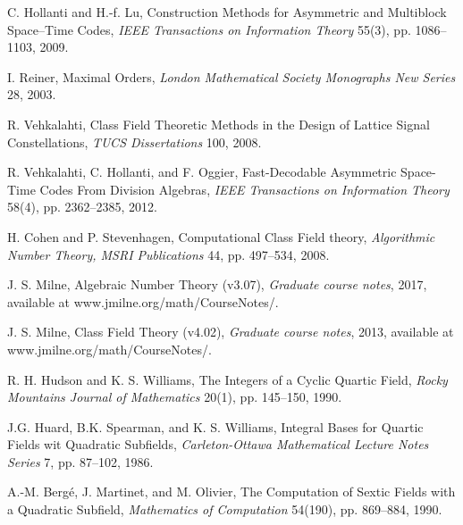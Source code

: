 \documentclass[smallextended]{svjour3}
\begin{document}
\begin{thebibliography}{99}
C. Hollanti and H.-f. Lu,
Construction Methods for Asymmetric and Multiblock Space--Time Codes,
\textit{IEEE Transactions on Information Theory} 55(3), pp. 1086--1103, 2009.

I. Reiner,
Maximal Orders, 
\textit{London Mathematical Society Monographs New Series} 28, 2003.

R. Vehkalahti, 
Class Field Theoretic Methods in the Design of Lattice Signal Constellations, 
\textit{TUCS Dissertations} 100, 2008.
 
R. Vehkalahti, C. Hollanti, and F. Oggier, 
Fast-Decodable Asymmetric Space-Time Codes From Division Algebras, 
\emph{IEEE Transactions on Information Theory} 58(4), pp. 2362--2385, 2012.
 
 
H. Cohen and P. Stevenhagen, 
Computational Class Field theory, 
\textit{Algorithmic Number Theory, MSRI Publications} 44, pp. 497--534, 2008.

J. S. Milne,
Algebraic Number Theory (v3.07), 
\textit{Graduate course notes}, 2017, available at www.jmilne.org/math/CourseNotes/.

J. S. Milne, 
Class Field Theory (v4.02), 
\textit{Graduate course notes}, 2013, available at www.jmilne.org/math/CourseNotes/.

R. H. Hudson and K. S. Williams, 
The Integers of a Cyclic Quartic Field, 
\textit{Rocky Mountains Journal of Mathematics} 20(1), pp. 145--150, 1990.
  
J.G. Huard, B.K. Spearman, and K. S. Williams, 
Integral Bases for Quartic Fields wit Quadratic Subfields, 
\textit{Carleton-Ottawa Mathematical Lecture Notes Series} 7, pp. 87--102, 1986.

A.-M. Berg\'e, J. Martinet, and M. Olivier, 
The Computation of Sextic Fields with a Quadratic Subfield,
\textit{Mathematics of Computation} 54(190), pp. 869--884, 1990.





  

\end{thebibliography}
\end{document}
